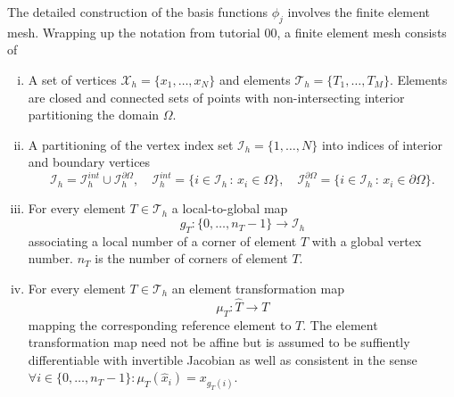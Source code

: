 \documentclass[a4paper,12pt]{article}
\begin{document}
The detailed construction of the basis functions $\phi_j$ involves the finite element mesh.
Wrapping up the notation from tutorial 00, a finite element mesh consists of
\begin{enumerate}[i)]
\item A set of vertices $\mathcal{X}_h = \{x_1,\ldots,x_N\}$ and
elements $\mathcal{T}_h = \{T_1, \ldots, T_M\}$. Elements are closed and connected sets of points
with non-intersecting interior partitioning the domain $\Omega$.
\item A partitioning of the vertex index set $\mathcal{I}_h=\{1,\ldots,N\}$
into indices of interior and boundary vertices
\begin{equation*}
\mathcal{I}_h = \mathcal{I}_h^{int}\cup\mathcal{I}_h^{\partial\Omega},
\quad \mathcal{I}_h^{int} = \{i\in \mathcal{I}_h\,:\, x_i\in\Omega\},
\quad \mathcal{I}_h^{\partial\Omega} = \{i\in \mathcal{I}_h\,:\, x_i\in\partial\Omega\}.
\end{equation*}
\item For every element $T\in\mathcal{T}_h$ a local-to-global map 
$$g_T:\{0,\ldots,n_T-1\}\to\mathcal{I}_h$$ 
associating a local number of a corner of element $T$ with a global vertex number.
$n_T$ is the number of corners of element $T$.
\item For every element $T\in\mathcal{T}_h$ an element transformation map
$$\mu_T : \hat T \to T$$
mapping the corresponding reference element to $T$. The element transformation
map need not be affine but is assumed to be suffiently differentiable with invertible
Jacobian as well as consistent in the sense 
$\forall i\in\{0,\ldots,n_T-1\} : \mu_T(\hat x_i) = x_{g_T(i)}$.
\end{enumerate}
\end{document}
